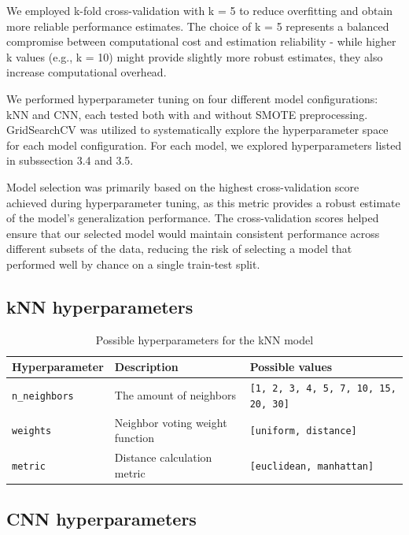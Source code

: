 \documentclass{article}
\begin{document}
We employed k-fold cross-validation with k = 5 to reduce overfitting and obtain more reliable performance estimates. The choice of k = 5 represents a balanced compromise between computational cost and estimation reliability - while higher k values (e.g., k = 10) might provide slightly more robust estimates, they also increase computational overhead.

We performed hyperparameter tuning on four different model configurations: kNN and CNN, each tested both with and without SMOTE preprocessing. GridSearchCV was utilized to systematically explore the hyperparameter space for each model configuration. For each model, we  explored hyperparameters listed in subssection 3.4 and 3.5.

Model selection was primarily based on the highest cross-validation score achieved during hyperparameter tuning, as this metric provides a robust estimate of the model's generalization performance. The cross-validation scores helped ensure that our selected model would maintain consistent performance across different subsets of the data, reducing the risk of selecting a model that performed well by chance on a single train-test split.

\newpage

\subsection{kNN hyperparameters}

\begin{table}[ht]
    \centering
    \begin{tabular}{|l|l|l|}
        \hline
        \textbf{Hyperparameter} & \textbf{Description}  & \textbf{Possible values} \\
        \hline
        \texttt{n\_neighbors} & The amount of neighbors & \texttt{[1, 2, 3, 4, 5, 7, 10, 15, 20, 30]} \\
        \hline
        \texttt{weights} & Neighbor voting weight function & \texttt{[uniform, distance]} \\
        \hline
        \texttt{metric} & Distance calculation metric & \texttt{[euclidean, manhattan]} \\
        \hline
    \end{tabular}
    \caption{Possible hyperparameters for the kNN model}
\end{table}

\subsection{CNN hyperparameters}
\end{document}

